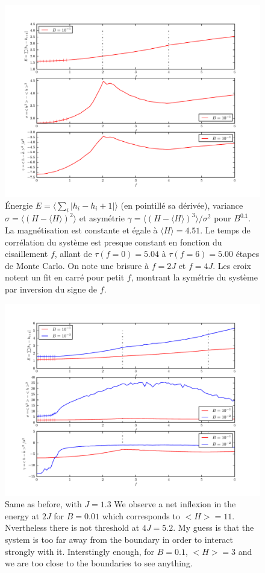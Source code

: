 \begin{figure}[h]
	\includegraphics[width=\linewidth]{./semiifgeom/sosj1.pdf}
	\caption{Énergie $E= \langle \sum_i |h_i-h_i+1| \rangle$ (en pointillé sa dérivée), variance $\sigma = \langle (H - \langle H \rangle )^2  \rangle$ et asymétrie $\gamma = \langle (H - \langle H \rangle )^3  \rangle / \sigma^2$ pour $B^0.1$. La magnétisation est constante et égale à $\langle H \rangle = 4.51$. Le temps de corrélation du système est presque constant en fonction du cisaillement $f$, allant de  $\tau(f=0) = 5.04$ à $\tau(f=6) = 5.00$ étapes de Monte Carlo. On note une brisure à $f=2J$ et $f=4J$.
Les croix notent un fit en carré pour petit $f$, montrant la symétrie du système par inversion du signe de $f$. }
\end{figure}

\begin{figure}
	\includegraphics[width=\linewidth]{./semiifgeom/j13.pdf}
	\caption{Same as before, with $J=1.3$ We observe a net inflexion in the energy at $2 J$ for  $B=0.01$ which corresponds to $<H>=11$. Nvertheless there is not threshold at $4 J = 5.2$. My guess is that the system is too far away from the boundary in order to interact strongly with it. Interstingly enough, for $B=0.1$, $<H>=3$ and we are too close to the boundaries to see anything.}
\end{figure}

